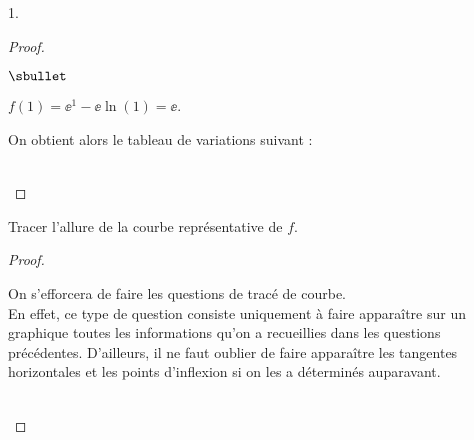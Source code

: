 \documentclass[11pt]{article}%
\begin{document}
\begin{noliste}{1.}
\begin{proof}
\begin{noliste}{$\sbullet$}
    \item $f(1)=\ee^1-\ee\ln(1)=\ee$.
    \end{noliste}
    
    On obtient alors le tableau de variations suivant :
    
    \begin{center}
    \end{center}~\\[-1.4cm]
  \end{proof}
  
\item Tracer l'allure de la courbe représentative de $f$.
  
  \begin{proof}~
 
    \begin{center}
      \shorthandoff{;}
    \end{center}
    
    
    \newpage
    
    
    \begin{remark}
      On s'efforcera de faire les questions de tracé de courbe.\\
      En effet, ce type de question consiste uniquement à faire
      apparaître sur un graphique toutes les informations qu'on a
      recueillies dans les questions précédentes. D'ailleurs, il ne
      faut oublier de faire apparaître les tangentes horizontales  
      et les points d'inflexion si on les a déterminés auparavant.
    \end{remark}~\\[-1.2cm]
  \end{proof}
    

\end{noliste}
\end{document}
